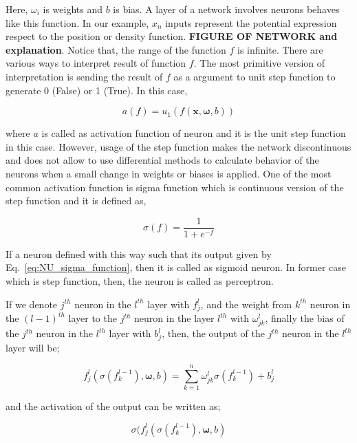 \documentclass[a4paper,times,12pt]{article}
\begin{document}
Here, $\omega_i$ is weights and $b$ is bias. A layer of a network involves neurons behaves like this function. In our example, $x_n$ inputs represent the potential expression respect to the position or density function. \textbf{FIGURE OF NETWORK and explanation}. Notice that, the range of the function $f$ is infinite. There are various ways to interpret result of function $f$. The most primitive version of interpretation is sending the result of $f$ as a argument to unit step function to generate 0 (False) or 1 (True). In this case, 

\begin{equation}
\label{eq:NU_step_function}
a(f) = u_1(f(\boldsymbol{x}, \boldsymbol{\omega}, b))
\end{equation}

where $a$ is called as activation function of neuron and it is the unit step function in this case. However, usage of the step function makes the network discontinuous and does not allow to use differential methods to calculate behavior of the neurons when a small change in weights or biases is applied. One of the most common activation function is sigma function which is continuous version of the step function and it is defined as,

\begin{equation}
\label{eq:NU_sigma_function}
\sigma(f) = \frac{1}{1 + e^{-f}}
\end{equation}

If a neuron defined with this way such that its output given by Eq.~\ref{eq:NU_sigma_function}, then it is called as sigmoid neuron. In former case which is step function, then, the neuron is called as perceptron. 

If we denote $j^{th}$ neuron in the $l^{th}$ layer with $f_j^l$, and the weight from $k^{th}$ neuron in the $(l-1)^{th}$ layer to the $j^{th}$ neuron in the layer $l^{th}$ with $\omega_{jk}^l$, finally the bias of the $j^{th}$ neuron in the $l^{th}$ layer with ${b_j^l}$, then, the output of the $j^{th}$ neuron in the $l^{th}$ layer will be;

\begin{equation}
\label{eq:NU_neuron_connection}
f_j^{l}(\sigma(f_k^{l-1}), \boldsymbol{\omega}, b) = \sum\limits_{k=1}^{n} \omega_{jk}^{l}\sigma(f_k^{l-1}) + b_j^l
\end{equation}

\noindent and the activation of the output can be written as;

\begin{equation}
\sigma(f_j^{l}(\sigma(f_k^{l-1}), \boldsymbol{\omega}, b)
\end{equation}
\end{document}
